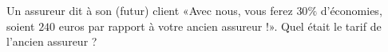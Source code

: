 
\begin{exercice}\label{exoPremiere-0023}

    Un assureur dit à son (futur) client «Avec nous, vous ferez \( 30\%\) d'économies, soient \( 240\) euros par rapport à votre ancien assureur !». Quel était le tarif de l'ancien assureur ?

\end{exercice}
